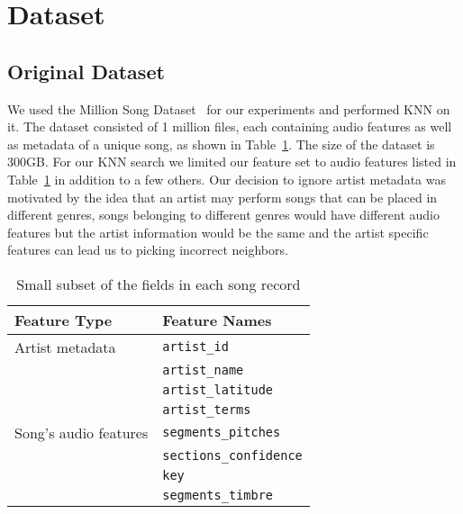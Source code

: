 \section{Dataset}
\label{sec:dataset}
\subsection{Original Dataset}
\label{subsec: meth_orig_dataset}
We used the Million Song Dataset~\cite{Bertin-Mahieux2011, msd01} for our experiments and performed KNN on it. 
The dataset consisted of 1 million files, each containing audio features as well as metadata of a unique song, as shown in Table~\ref{table:field_msd_rec}. 
The size of the dataset is 300GB. 
For our KNN search we limited our feature set to audio features listed in Table~\ref{table:field_msd_rec} in addition to a few others. 
Our decision to ignore artist metadata was motivated by the idea that an artist may perform songs that can be placed in different genres, songs belonging to different genres would have different audio features but the artist information would be the same and the artist specific features can lead us to picking incorrect neighbors.
\begin{table}
\begin{center}
\begin{tabular}{| l | l |}
\hline
\textbf{Feature Type} & \textbf{Feature Names} \\
\hline
Artist metadata & \texttt{artist\_id} \\
 & \texttt{artist\_name}\\
 & \texttt{artist\_latitude}\\
 & \texttt{artist\_terms}\\
\hline
Song's audio features & \texttt{segments\_pitches}\\
 & \texttt{sections\_confidence}\\
 & \texttt{key}\\
 & \texttt{segments\_timbre}\\
\hline
\end{tabular}
\caption{Small subset of the fields in each song record}
\label{table:field_msd_rec}
\end{center}
\end{table}

